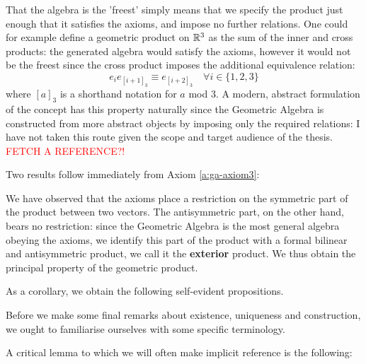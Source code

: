 \begin{remark}
	That the algebra is the 'freest' simply means that we specify the product just enough that it satisfies the axioms, and impose no further relations. One could for example define a geometric product on $\mathbb{R}^3$ as the sum of the inner and cross products: the generated algebra would satisfy the axioms, however it would not be the freest since the cross product imposes the additional equivalence relation:
	\[e_ie_{[i+1]_3} \equiv e_{[i+2]_3} \quad \forall i \in \{1,2,3\}\]
	where $[a]_3$ is a shorthand notation for $a$ mod $3$.
	A modern, abstract formulation of the concept has this property naturally since the Geometric Algebra is constructed from more abstract objects by imposing only the required relations: I have not taken this route given the scope and target audience of the thesis. \textcolor{red}{FETCH A REFERENCE?!}
\end{remark}

Two results follow immediately from Axiom \ref{a:ga-axiom3}:





%

We have observed that the axioms place a restriction on the symmetric part of the product between two vectors. The antisymmetric part, on the other hand, bears no restriction: since the Geometric Algebra is the most general algebra obeying the axioms, we identify this part of the product with a formal bilinear and antisymmetric product, we call it the \textbf{exterior} product. We thus obtain the principal property of the geometric product.



As a corollary, we obtain the following self-evident propositions.
%
%



Before we make some final remarks about existence, uniqueness and construction, we ought to familiarise ourselves with some specific terminology.


A critical lemma to which we will often make implicit reference is the following:



